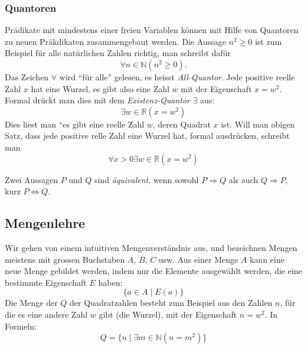 \subsubsection{Quantoren}
%
Prädikate mit mindestens einer freien Variablen können mit Hilfe
von Quantoren zu neuen Präkdikaten zusammengebaut werden.
Die Aussage $n^2\ge 0$ ist zum Beispiel für alle natürlichen
Zahlen richtig, man schreibt dafür
\[
\forall n\in\mathbb N(n^2\ge 0).
\]
%
Das Zeichen $\forall$ wird ``für alle'' gelesen, es heisst
{\em All-Quantor}.
%
Jede positive reelle Zahl $x$ hat eine Wurzel, es gibt also eine
Zahl $w$ mit der Eigenschaft $x=w^2$.
Formal drückt man dies mit
dem {\em Existenz-Quantor} $\exists$ aus:
\[
\exists w\in\mathbb R(x =w^2)
\]
Dies liest man ``es gibt eine reelle Zahl $w$, deren Quadrat $x$ ist.
Will man obigen Satz, dass jede positive relle Zahl eine Wurzel hat,
formal ausdrücken, schreibt man
\[
\forall x>0\exists w\in\mathbb R(x=w^2)
\]

Zwei Aussagen $P$ und $Q$ sind {\em äquivalent}, wenn sowohl
$P\Rightarrow Q$ als auch $Q\Rightarrow P$, kurz $P\Leftrightarrow Q$.

\subsection{Mengenlehre}
%
Wir gehen von einem intuitiven Mengenverständnis aus, und bezeichnen
Mengen meistens mit grossen Buchstaben $A$, $B$, $C$ usw.
Aus einer Menge $A$ kann eine neue Menge gebildet werden, indem
nur die Elemente ausgewählt werden, die eine bestimmte Eigenschaft
$E$ haben:
\[
\{a\in A\;|\;E(a)\}
\]
Die Menge der $Q$ der Quadratzahlen besteht zum Beispiel aus den
Zahlen $n$, für
die es eine andere Zahl $w$ gibt (die Wurzel), mit der Eigenschaft
$n=w^2$.
In Formeln:
\[
Q=\{n\; |\; \exists m\in\mathbb N(n=m^2)\}
\]

